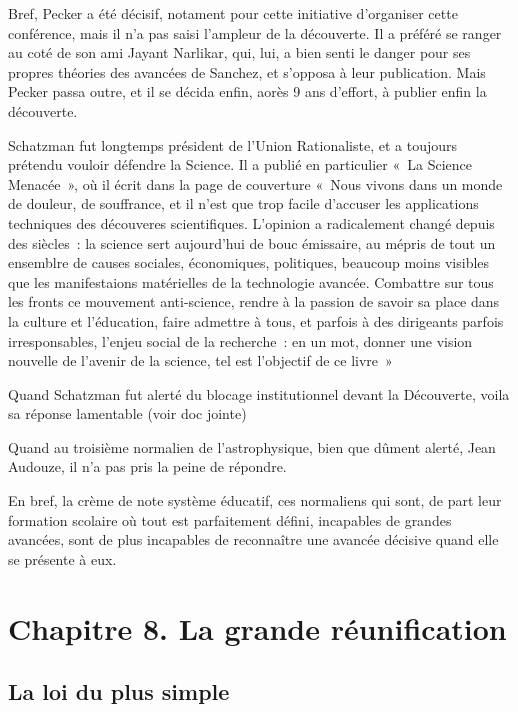 \documentclass[a4paper,12pt]{article}
\begin{document}
Bref, Pecker a été décisif, notament pour cette initiative d'organiser cette conférence, mais il n’a pas saisi l’ampleur de la découverte. Il a préféré se ranger au coté de son ami Jayant Narlikar, qui, lui, a bien senti le danger pour ses propres théories des avancées de Sanchez, et s'opposa à leur publication. Mais Pecker passa outre, et il se décida enfin, aorès 9 ans d'effort, à publier enfin la découverte.

    Schatzman fut longtemps président de l’Union Rationaliste, et a toujours prétendu vouloir défendre la Science. Il a publié en particulier « La Science Menacée », où il écrit dans la page de couverture  « Nous vivons dans un monde de douleur, de souffrance, et il n’est que trop facile d’accuser les applications techniques des découveres scientifiques. L’opinion a radicalement changé depuis des siècles : la science sert aujourd’hui de bouc émissaire, au mépris de tout un ensemblre de causes sociales, économiques, politiques, beaucoup moins visibles que les manifestaions matérielles de la technologie avancée. Combattre sur tous les fronts ce mouvement anti-science, rendre à la passion de savoir sa place dans la culture et l’éducation, faire admettre à tous, et parfois à des dirigeants parfois irresponsables, l’enjeu social de  la recherche : en un mot, donner une vision nouvelle de l’avenir de la science, tel est l’objectif de ce livre »

 Quand Schatzman fut alerté du blocage institutionnel devant la Découverte, voila sa réponse lamentable  (voir doc jointe) 

Quand au troisième normalien de l’astrophysique, bien que dûment alerté, Jean Audouze, il n’a pas pris la peine de répondre.

En bref, la crème de note système éducatif, ces normaliens qui sont, de part leur formation scolaire où tout est parfaitement défini, incapables de grandes avancées, sont de plus incapables de reconna\^itre une avancée décisive quand elle se présente à eux.


 





\section{Chapitre 8. La grande réunification}
\subsection{La loi du plus simple}
\end{document}
